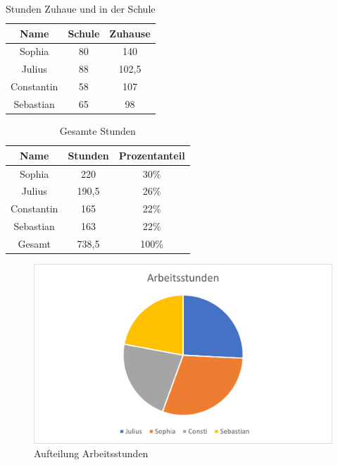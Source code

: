 \vspace{3mm}
\begin{table}[H]
    \centering
    \begin{tabular}{|c|c|c|}
    \hline
      \textbf{Name} & \textbf{Schule} & \textbf{Zuhause}\\
      \hline
       Sophia  & 80&140\\
       \hline
       Julius & 88& 102,5\\
       \hline
       Constantin &58&107\\
       \hline
       Sebastian&65&98\\
       \hline
    \end{tabular}
    \caption{Stunden Zuhaue und in der Schule}
    \label{tab:my_label}
\end{table}

\vspace{3mm}
\begin{table}[H]
	\centering
	\begin{tabular}{|c|c|c|}
		\hline
		\textbf{Name} & \textbf{Stunden}& \textbf{Prozentanteil}\\
		\hline
		Sophia  & 220& 30\%\\
		\hline
		Julius & 190,5&26\%\\
		\hline
		Constantin &165&22\%\\
		\hline
		Sebastian&163&22\%\\
		\hline
		Gesamt&738,5&100\%\\
		\hline
	\end{tabular}
	\caption{Gesamte Stunden}
	\label{tab:my_label}
\end{table}
\begin{figure}[H]
	\centering
	\includegraphics[scale=1.2]{image/graf.png}
	\caption{Aufteilung Arbeitsstunden}
	\label{fig:enter-label}
\end{figure}

